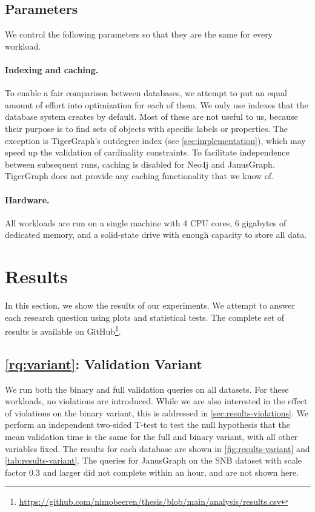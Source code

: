 \documentclass{report}
\theoremstyle{definition}
\begin{document}
\subsection{Parameters}

We control the following parameters so that they are the same for every workload.

\paragraph{Indexing and caching.} To enable a fair comparison between databases, we attempt to put an equal amount of effort into optimization for each of them. We only use indexes that the database system creates by default. Most of these are not useful to us, because their purpose is to find sets of objects with specific labels or properties. The exception is TigerGraph's outdegree index (see \autoref{sec:implementation}), which may speed up the validation of cardinality constraints. To facilitate independence between subsequent runs, caching is disabled for Neo4j and JanusGraph. TigerGraph does not provide any caching functionality that we know of.

\paragraph{Hardware.} All workloads are run on a single machine with 4 CPU cores, 6 gigabytes of dedicated memory, and a solid-state drive with enough capacity to store all data.

\section{Results}

In this section, we show the results of our experiments. We attempt to answer each research question using plots and statistical tests. The complete set of results is available on GitHub\footnote{\url{https://github.com/nimobeeren/thesis/blob/main/analysis/results.csv}}.

\subsection{\ref*{rq:variant}: Validation Variant}

We run both the binary and full validation queries on all datasets. For these workloads, no violations are introduced. While we are also interested in the effect of violations on the binary variant, this is addressed in \autoref{sec:results-violations}. We perform an independent two-sided T-test \citep{student1908probable} to test the null hypothesis that the mean validation time is the same for the full and binary variant, with all other variables fixed. The results for each database are shown in \autoref{fig:results-variant} and \autoref{tab:results-variant}. The queries for JanusGraph on the SNB dataset with scale factor 0.3 and larger did not complete within an hour, and are not shown here.
\end{document}
